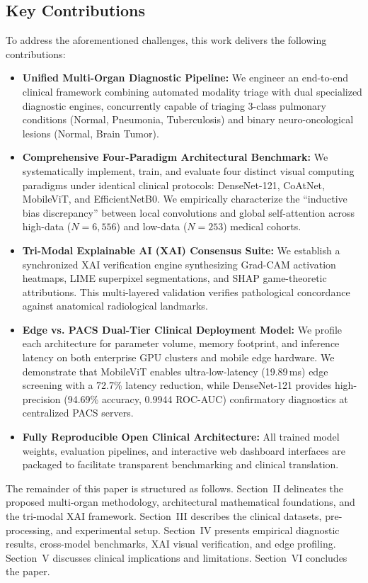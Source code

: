 \documentclass[journal]{IEEEtran}
\begin{document}
\subsection{Key Contributions}
To address the aforementioned challenges, this work delivers the following contributions:
\begin{itemize}
    \item \textbf{Unified Multi-Organ Diagnostic Pipeline:} We engineer an end-to-end clinical framework combining automated modality triage with dual specialized diagnostic engines, concurrently capable of triaging 3-class pulmonary conditions (Normal, Pneumonia, Tuberculosis) and binary neuro-oncological lesions (Normal, Brain Tumor).
    \item \textbf{Comprehensive Four-Paradigm Architectural Benchmark:} We systematically implement, train, and evaluate four distinct visual computing paradigms under identical clinical protocols: DenseNet-121, CoAtNet, MobileViT, and EfficientNetB0. We empirically characterize the ``inductive bias discrepancy'' between local convolutions and global self-attention across high-data ($N=6,556$) and low-data ($N=253$) medical cohorts.
    \item \textbf{Tri-Modal Explainable AI (XAI) Consensus Suite:} We establish a synchronized XAI verification engine synthesizing Grad-CAM activation heatmaps, LIME superpixel segmentations, and SHAP game-theoretic attributions. This multi-layered validation verifies pathological concordance against anatomical radiological landmarks.
    \item \textbf{Edge vs. PACS Dual-Tier Clinical Deployment Model:} We profile each architecture for parameter volume, memory footprint, and inference latency on both enterprise GPU clusters and mobile edge hardware. We demonstrate that MobileViT enables ultra-low-latency (19.89\,ms) edge screening with a 72.7\% latency reduction, while DenseNet-121 provides high-precision (94.69\% accuracy, 0.9944 ROC-AUC) confirmatory diagnostics at centralized PACS servers.
    \item \textbf{Fully Reproducible Open Clinical Architecture:} All trained model weights, evaluation pipelines, and interactive web dashboard interfaces are packaged to facilitate transparent benchmarking and clinical translation.
\end{itemize}

The remainder of this paper is structured as follows. Section~II delineates the proposed multi-organ methodology, architectural mathematical foundations, and the tri-modal XAI framework. Section~III describes the clinical datasets, pre-processing, and experimental setup. Section~IV presents empirical diagnostic results, cross-model benchmarks, XAI visual verification, and edge profiling. Section~V discusses clinical implications and limitations. Section~VI concludes the paper.
\end{document}
